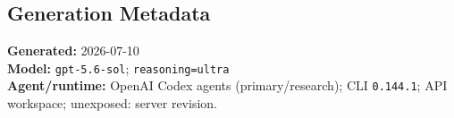 \begin{deepstudy}
\section*{Generation Metadata}

{\footnotesize
\textbf{Generated:} 2026-07-10\\
\textbf{Model:} \texttt{gpt-5.6-sol}; \texttt{reasoning=ultra}\\
\textbf{Agent/runtime:} OpenAI Codex agents (primary/research); CLI \texttt{0.144.1}; API workspace; unexposed: server revision.\par
}

\end{deepstudy}

